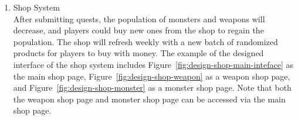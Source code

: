 \documentclass[12pt,oneside,openright,a4paper]{cpe-english-project}
\begin{document}
\begin{itemize}
\begin{enumerate}
	\item Shop System \\
	After submitting quests, the population of monsters and weapons will decrease, and players could buy new ones from the shop to regain the population. The shop will refresh weekly with a new batch of randomized products for players to buy with money. The example of the designed interface of the shop system includes Figure~\ref{fig:design-shop-main-inteface} as the main shop page, Figure~\ref{fig:design-shop-weapon} as a weapon shop page, and Figure~\ref{fig:design-shop-monster} as a monster shop page. Note that both the weapon shop page and monster shop page can be accessed via the main shop page. \\
	\begin{minipage}[c]{\textwidth}\centering
	\label{fig:design-shop-main-inteface}
	\end{minipage}
	\begin{minipage}[c]{\textwidth}\centering
	\label{fig:design-shop-weapon}
	\end{minipage}

\end{enumerate}
\end{itemize}
\end{document}

